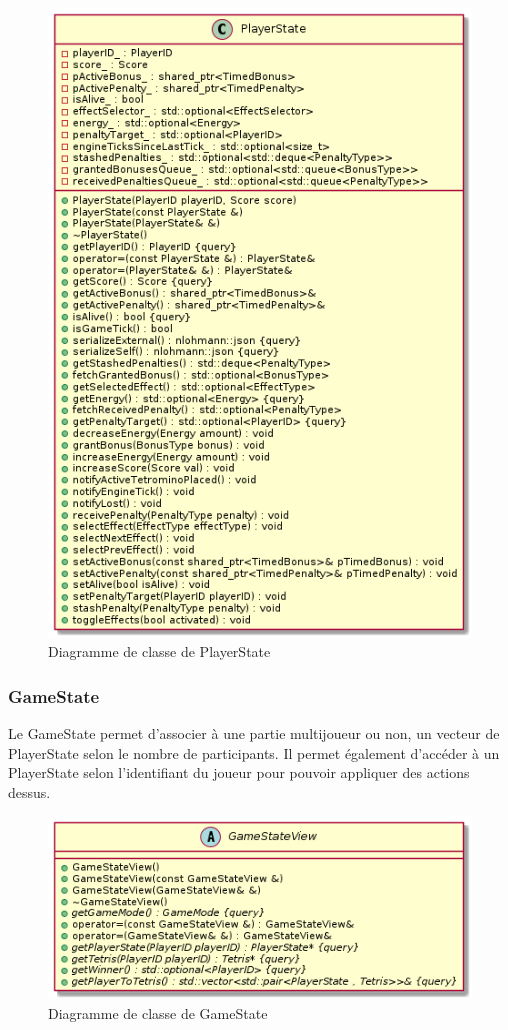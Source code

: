\documentclass{article}
\begin{document}
\begin{figure}[!ht]
	\centering
	 \includegraphics[scale=0.3]{../res/uml/class/PlayerStateClass.png}
	 \caption{Diagramme de classe de PlayerState}
	 \label{fig:main-menu}
\end{figure}

\subsubsection*{GameState}

Le GameState permet d'associer à une partie multijoueur ou non, un vecteur de PlayerState selon le nombre de participants. Il permet également d'accéder à un PlayerState selon l'identifiant du joueur pour pouvoir appliquer des actions dessus.

\begin{figure}[!h]
	\centering
	 \includegraphics[scale=0.3]{../res/uml/class/GameStateViewClass.png}
	 \caption{Diagramme de classe de GameState}
	 \label{fig:main-menu}
\end{figure}
\end{document}
